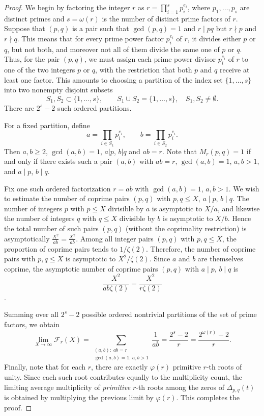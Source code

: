 \documentclass[table]{amsart}
\newcommand{\op}[1]{\operatorname{#1}}
\numberwithin{equation}{section}
\begin{document}
\begin{proof}
We begin by factoring the integer \(r\) as $r = \prod_{i=1}^{s} p_i^{e_i}$,
where \(p_1,\dots,p_s\) are distinct primes and \(s=\omega(r)\) is the number of distinct prime factors of \(r\). Suppose that $(p,q)$ is a pair such that $\op{gcd}(p,q)=1$ and \(r\mid pq\) but \(r\nmid p\) and \(r\nmid q\). This means that for every prime power factor \(p_i^{e_i}\) of \(r\), it divides either \(p\) or \(q\), but not both, and moreover not all of them divide the same one of \(p\) or \(q\). Thus, for the pair \((p,q)\), we must assign each prime power divisor \(p_i^{e_i}\) of \(r\) to one of the two integers \(p\) or \(q\), with the restriction that both \(p\) and \(q\) receive at least one factor. This amounts to choosing a partition of the index set \(\{1,\dots,s\}\) into two nonempty disjoint subsets
\[
S_1, S_2 \subset \{1,\dots,s\}, \qquad S_1\cup S_2 = \{1,\dots,s\}, \quad S_1,S_2\ne\emptyset.
\]
There are \(2^s - 2\) such ordered partitions.  

For a fixed partition, define
\[
a = \prod_{i\in S_1} p_i^{e_i}, \qquad b = \prod_{i\in S_2} p_i^{e_i}.
\]
Then \(a,b\ge2\), \(\gcd(a,b)=1\), $a|p$, $b|q$ and \(ab=r\). Note that \(M_r(p,q)=1\) if and only if there exists such a pair \((a,b)\) with \(ab=r\), \(\gcd(a,b)=1\), \(a,b>1\), and \(a\mid p\), \(b\mid q\).
\par Fix one such ordered factorization \(r=ab\) with \(\gcd(a,b)=1\), \(a,b>1\).  
We wish to estimate the number of coprime pairs \((p,q)\) with \(p,q\le X\), \(a\mid p\), \(b\mid q\). The number of integers \(p\) with \(p\le X\) divisible by \(a\) is asymptotic to \(X/a\), and likewise the number of integers \(q\) with \(q\le X\) divisible by \(b\) is asymptotic to \(X/b\). Hence the total number of such pairs \((p,q)\) (without the coprimality restriction) is asymptotically $\frac{X^2}{ab} = \frac{X^2}{ab}$. Among all integer pairs \((p,q)\) with \(p,q\le X\), the proportion of coprime pairs tends to \(1/\zeta(2)\). Therefore, the number of coprime pairs with \(p,q\le X\) is asymptotic to \(X^2/\zeta(2)\).  Since $a$ and $b$ are themselves coprime, the asymptotic number of coprime pairs \((p,q)\) with \(a\mid p\), \(b\mid q\) is \[\frac{X^2}{ab\zeta(2)}=\frac{X^2}{r\zeta(2)}\]. 
\par Summing over all \(2^s-2\) possible ordered nontrivial partitions of the set of prime factors, we obtain
\[
\lim_{X\to\infty} \mathcal{F}_r(X)
= \sum_{\substack{(a,b):\; ab=r\\ \gcd(a,b)=1,\, a,b>1}} \frac{1}{ab}
= \frac{2^s - 2}{r}
= \frac{2^{\omega(r)} - 2}{r}.
\] 
Finally, note that for each \(r\), there are exactly \(\varphi(r)\) primitive \(r\)-th roots of unity. Since each such root contributes equally to the multiplicity count, the limiting average multiplicity of \emph{primitive} \(r\)-th roots among the zeros of \(\Delta_{p,q}(t)\) is obtained by multiplying the previous limit by \(\varphi(r)\). This completes the proof.
\end{proof}
\end{document}
